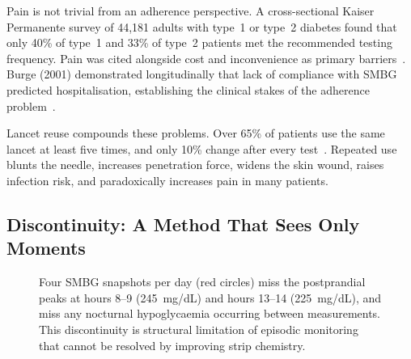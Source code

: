Pain is not trivial from an adherence perspective. A cross-sectional Kaiser Permanente survey of 44,181 adults with type~1 or type~2 diabetes found that only 40\% of type~1 and 33\% of type~2 patients met the recommended testing frequency. Pain was cited alongside cost and inconvenience as primary barriers~\cite{lancing_pmid}. Burge (2001) demonstrated longitudinally that lack of compliance with SMBG predicted hospitalisation, establishing the clinical stakes of the adherence problem~\cite{laser2022}.

Lancet reuse compounds these problems. Over 65\% of patients use the same lancet at least five times, and only 10\% change after every test~\cite{peled2012}. Repeated use blunts the needle, increases penetration force, widens the skin wound, raises infection risk, and paradoxically increases pain in many patients.

\subsection*{Discontinuity: A Method That Sees Only Moments}

\begin{figure}[H]
\centering
{}
\caption{Four SMBG snapshots per day (red circles) miss the postprandial peaks at hours 8--9 (245~mg/dL) and hours 13--14 (225~mg/dL), and miss any nocturnal hypoglycaemia occurring between measurements. This discontinuity is structural limitation of episodic monitoring that cannot be resolved by improving strip chemistry.}
\label{fig:fingerstick_timeseries}
\end{figure}

